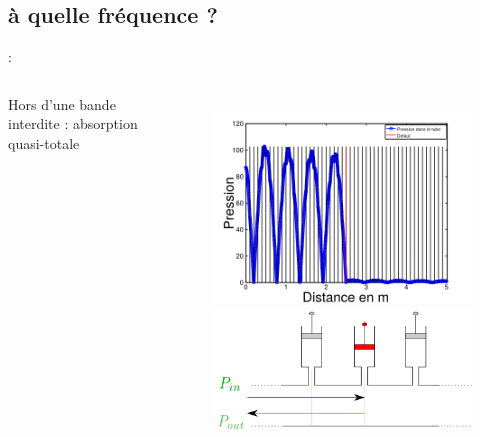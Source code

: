 \documentclass[12pt,xcolor=x11names,compress, notes=show]{beamer}%
\begin{document}
\subsection{à quelle fréquence ?}
\begin{frame}{\insertsectionhead : \insertsubsectionhead}
\begin{columns}[T]
	 Hors d'une bande interdite : absorption quasi-totale 
	\begin{figure}
		\centering
		\includegraphics[width=\textwidth]{horsbande_50RH_500Hz_71mm.png}\\
		\includegraphics[width=0.7 \textwidth]{schema_singu1.png}
	\end{figure}
	

\end{columns}
\end{frame}
\end{document}
